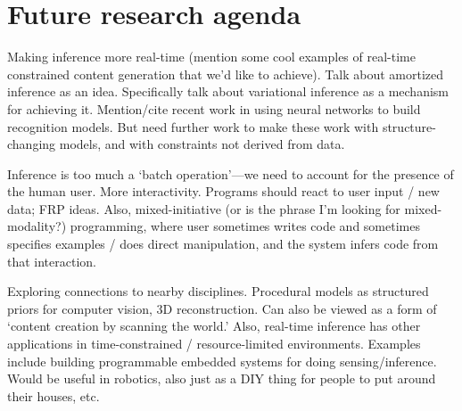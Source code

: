 \documentclass[
11pt, %
a4paper, %
oneside, %
headinclude,footinclude, %
BCOR5mm, %
]{scrartcl}
\begin{document}
\section*{Future research agenda}

Making inference more real-time (mention some cool examples of real-time constrained content generation that we'd like to achieve). Talk about amortized inference as an idea. Specifically talk about variational inference as a mechanism for achieving it. Mention/cite recent work in using neural networks to build recognition models. But need further work to make these work with structure-changing models, and with constraints not derived from data.

Inference is too much a `batch operation'---we need to account for the presence of the human user. More interactivity. Programs should react to user input / new data; FRP ideas. Also, mixed-initiative (or is the phrase I'm looking for mixed-modality?) programming, where user sometimes writes code and sometimes specifies examples / does direct manipulation, and the system infers code from that interaction.

Exploring connections to nearby disciplines. Procedural models as structured priors for computer vision, 3D reconstruction. Can also be viewed as a form of `content creation by scanning the world.' Also, real-time inference has other applications in time-constrained / resource-limited environments. Examples include building programmable embedded systems for doing sensing/inference. Would be useful in robotics, also just as a DIY thing for people to put around their houses, etc.
\end{document}
